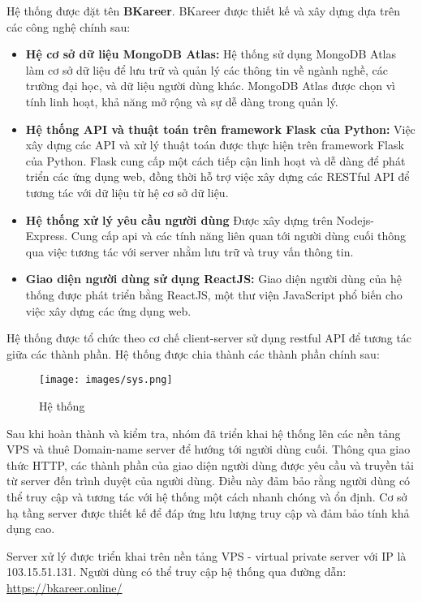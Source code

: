 Hệ thống được đặt tên \textbf{BKareer}.
BKareer được thiết kế và xây dựng dựa trên các công nghệ chính sau:
\begin{itemize}
    \item \textbf{Hệ cơ sở dữ liệu MongoDB Atlas:} Hệ thống sử dụng MongoDB Atlas làm cơ sở dữ liệu để lưu trữ và quản lý các thông tin về ngành nghề, các trường đại học, và dữ liệu người dùng khác. MongoDB Atlas được chọn vì tính linh hoạt, khả năng mở rộng và sự dễ dàng trong quản lý.
    \item \textbf{Hệ thống API và thuật toán trên framework Flask của Python:} Việc xây dựng các API và xử lý thuật toán được thực hiện trên framework Flask của Python. Flask cung cấp một cách tiếp cận linh hoạt và dễ dàng để phát triển các ứng dụng web, đồng thời hỗ trợ việc xây dựng các RESTful API để tương tác với dữ liệu từ hệ cơ sở dữ liệu.
    \item \textbf{Hệ thống xử lý yêu cầu người dùng} Được xây dựng trên Nodejs-Express. Cung cấp api và các tính năng liên quan tới người dùng cuối thông qua việc tương tác với server nhằm lưu trữ và truy vấn thông tin. 
    \item \textbf{Giao diện người dùng sử dụng ReactJS:} Giao diện người dùng của hệ thống được phát triển bằng ReactJS, một thư viện JavaScript phổ biến cho việc xây dựng các ứng dụng web.
\end{itemize}

Hệ thống được tổ chức theo cơ chế client-server sử dụng restful API để tương tác giữa các thành phần. Hệ thống được chia thành các thành phần chính sau:
\begin{figure}[H]
    \centering
    \texttt{[image: images/sys.png]}
    \vspace{0.5cm}
    \caption{Hệ thống}
\end{figure}

Sau khi hoàn thành và kiểm tra, nhóm đã triển khai hệ thống lên các nền tảng VPS và thuê Domain-name server để hướng tới người dùng cuối. Thông qua giao thức HTTP, các thành phần của giao diện người dùng được yêu cầu và truyền tải từ server đến trình duyệt của người dùng. Điều này đảm bảo rằng người dùng có thể truy cập và tương tác với hệ thống một cách nhanh chóng và ổn định. Cơ sở hạ tầng server được thiết kế để đáp ứng lưu lượng truy cập và đảm bảo tính khả dụng cao.

Server xử lý được triển khai trên nền tảng VPS - virtual private server với IP là 103.15.51.131.
Người dùng có thể truy cập hệ thống qua đường dẫn: \href{http://bkareer.online/}{\color{black}https://bkareer.online/}

